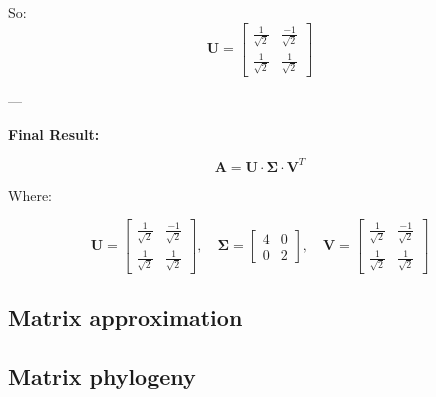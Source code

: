 So:
\[
\textbf{U} =
\begin{bmatrix}
\frac{1}{\sqrt{2}} & \frac{-1}{\sqrt{2}} \\
\frac{1}{\sqrt{2}} & \frac{1}{\sqrt{2}}
\end{bmatrix}
\]

---

\textbf{Final Result:}

\[
\textbf{A} = \textbf{U} \cdot \boldsymbol{\Sigma} \cdot \textbf{V}^T
\]

Where:

\[
\textbf{U} =
\begin{bmatrix}
\frac{1}{\sqrt{2}} & \frac{-1}{\sqrt{2}} \\
\frac{1}{\sqrt{2}} & \frac{1}{\sqrt{2}}
\end{bmatrix}, \quad
\boldsymbol{\Sigma} =
\begin{bmatrix}
4 & 0 \\
0 & 2
\end{bmatrix}, \quad
\textbf{V} =
\begin{bmatrix}
\frac{1}{\sqrt{2}} & \frac{-1}{\sqrt{2}} \\
\frac{1}{\sqrt{2}} & \frac{1}{\sqrt{2}}
\end{bmatrix}
\]


\subsection{Matrix approximation}
\subsection{Matrix phylogeny}
